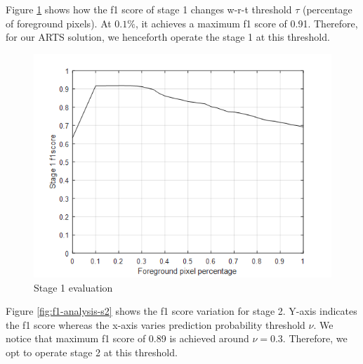 Figure \ref{fig:f1-analysis-mog} shows how the f1 score of stage 1 changes w-r-t threshold $\tau$ (percentage of foreground pixels). At $0.1\%$, it achieves a maximum f1 score of 0.91. Therefore, for our ARTS solution, we henceforth operate the stage 1 at this threshold.

\begin{figure}
    \centering
    \includegraphics[width=\linewidth]{images/f1-analysis-mog.png}
    \caption{Stage 1 evaluation}
    \label{fig:f1-analysis-mog}
\end{figure}

Figure \ref{fig:f1-analysis-s2} shows the f1 score variation for stage 2. Y-axis indicates the f1 score whereas the x-axis varies prediction probability threshold $\nu$. We notice that maximum f1 score of 0.89 is achieved around $\nu=0.3$. Therefore, we opt to operate stage 2 at this threshold.

